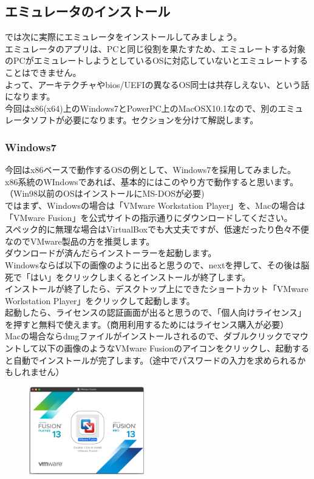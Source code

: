 \documentclass[b5paper,9pt,platex,dvipdfmx]{jsarticle}
\begin{document}
\begin{multicols*}{3}
{\section{エミュレータのインストール}
では次に実際にエミュレータをインストールしてみましょう。\\
エミュレータのアプリは、PCと同じ役割を果たすため、エミュレートする対象のPCがエミュレートしようとしているOSに対応していないとエミュレートすることはできません。\\
よって、アーキテクチャやbios/UEFIの異なるOS同士は共存しえない、という話になります。\\
今回はx86(x64)上のWindows7とPowerPC上のMacOSX10.1なので、別のエミュレータソフトが必要になります。セクションを分けて解説します。
\subsubsection{Windows7}
今回はx86ベースで動作するOSの例として、Windows7を採用してみました。\\
x86系統のWIndowsであれば、基本的にはこのやり方で動作すると思います。（Win98以前のOSはインストールにMS-DOSが必要)\\
ではまず、Windowsの場合は「VMware Workstation Player」を、Macの場合は「VMware Fusion」を公式サイトの指示通りにダウンロードしてください。\\
スペック的に無理な場合はVirtualBoxでも大丈夫ですが、低速だったり色々不便なのでVMware製品の方を推奨します。\\
ダウンロードが済んだらインストーラーを起動します。\\
Windowsならば以下の画像のように出ると思うので、nextを押して、その後は脳死で「はい」をクリックしまくるとインストールが終了します。\\
インストールが終了したら、デスクトップ上にできたショートカット「VMware Workstation Player」をクリックして起動します。\\
起動したら、ライセンスの認証画面が出ると思うので、「個人向けライセンス」を押すと無料で使えます。（商用利用するためにはライセンス購入が必要）\\
Macの場合ならdmgファイルがインストールされるので、ダブルクリックでマウントして以下の画像のようなVMware Fusionのアイコンをクリックし、起動すると自動でインストールが完了します。（途中でパスワードの入力を求められるかもしれません）\\
\begin{figure}[H]
  \centering
  \includegraphics[width=5cm]{1.png}

\end{figure}}
\end{multicols*}
\end{document}
